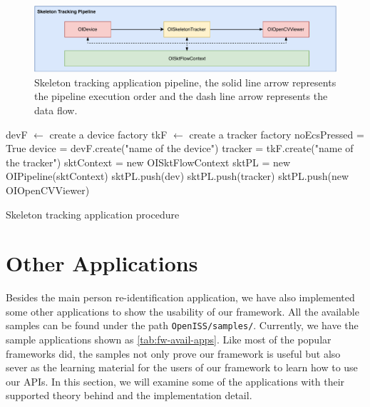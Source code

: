 \begin{figure}
    \centering
    \includegraphics[width=\linewidth]{figures/framework_app_skt_pipeline.pdf}
    \caption[Skeleton tracking application pipeline]
    {Skeleton tracking application pipeline, the solid line arrow represents
    the pipeline execution order and the dash line arrow represents the
    data flow.}
    \label{fig:fw-app-skt-pipeline}
\end{figure}

\begin{algorithm}
    devF $\leftarrow$ create a device factory\;
    tkF $\leftarrow$ create a tracker factory\;
    \;
    noEcsPressed = True\;
    device = devF.create("name of the device")\;
    tracker = tkF.create("name of the tracker")\;
    \;
    sktContext = new OISktFlowContext \;
    sktPL = new OIPipeline(sktContext) \;
    sktPL.push(dev)\;
    sktPL.push(tracker)\;
    sktPL.push(new OIOpenCVViewer)\;
    \;
    \caption{Skeleton tracking application procedure}
    \label{algo:fw-app-skt}
\end{algorithm}



\section{Other Applications}
\label{sec:Impl-fw-app-other}

Besides the main person re-identification application, we have also implemented
some other applications to show the usability of our framework. All the
available samples can be found under the path \texttt{OpenISS/samples/}.
Currently, we have the sample applications shown as \autoref{tab:fw-avail-apps}.
Like most of the popular frameworks did, the samples not only prove our
framework is useful but also sever as the learning material for the users of
our framework to learn how to use our APIs.
In this section, we will examine some of the applications with their
supported theory behind and the implementation detail.


